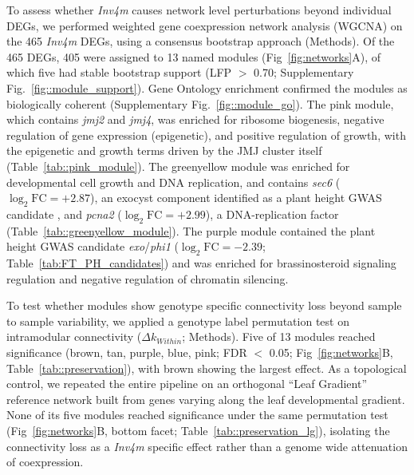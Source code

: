 \documentclass[9pt,twocolumn,twoside]{rilabRxiv}
\newcommand{\invfour}{\textit{Inv4m}\xspace}
\newcommand{\jmjii}{\textit{jmj2}\xspace}
\newcommand{\jmjiv}{\textit{jmj4}\xspace}
\begin{document}
To assess whether \invfour causes network level perturbations beyond individual DEGs, we performed weighted gene coexpression network analysis (WGCNA) \citep{shahan2018} on the 465 \invfour DEGs, using a consensus bootstrap approach (Methods).
Of the 465 DEGs, 405 were assigned to 13 named modules (Fig~\ref{fig:networks}A), of which five had stable bootstrap support (LFP $>$ 0.70; Supplementary Fig.~\ref{fig::module_support}). 
Gene Ontology enrichment confirmed the modules as biologically coherent (Supplementary Fig.~\ref{fig::module_go}). 
The pink module, which contains \jmjii and \jmjiv, was enriched for ribosome biogenesis, negative regulation of gene expression (epigenetic), and positive regulation of growth, with the epigenetic and growth terms driven by the JMJ cluster itself (Table~\ref{tab::pink_module}). 
The greenyellow module was enriched for developmental cell growth and DNA replication, and contains \textit{sec6} ($\log_2\text{FC} = +2.87$), an exocyst component identified as a plant height GWAS candidate \citep{peiffer2014}, and \textit{pcna2} ($\log_2\text{FC} = +2.99$), a DNA-replication factor (Table~\ref{tab::greenyellow_module}). 
The purple module contained the plant height GWAS candidate
\textit{exo}/\textit{phi1} ($\log_2\text{FC} = -2.39$; Table~\ref{tab:FT_PH_candidates}) and was enriched for brassinosteroid signaling regulation and negative regulation of chromatin silencing.

To test whether modules show genotype specific connectivity loss beyond sample to sample variability, we applied a genotype label permutation test on intramodular connectivity ($\Delta k_{Within}$; Methods). Five of 13 modules reached significance (brown, tan, purple, blue, pink; FDR $<$ 0.05; Fig~\ref{fig:networks}B, Table~\ref{tab::preservation}), with brown showing the largest effect.
As a topological control, we repeated the entire pipeline on an orthogonal ``Leaf Gradient'' reference network built from genes varying along the leaf developmental gradient. None of its five modules reached significance under the same permutation test (Fig~\ref{fig:networks}B, bottom facet; Table~\ref{tab::preservation_lg}), isolating the connectivity loss as a \invfour specific effect rather than a genome wide attenuation of coexpression.
\end{document}
